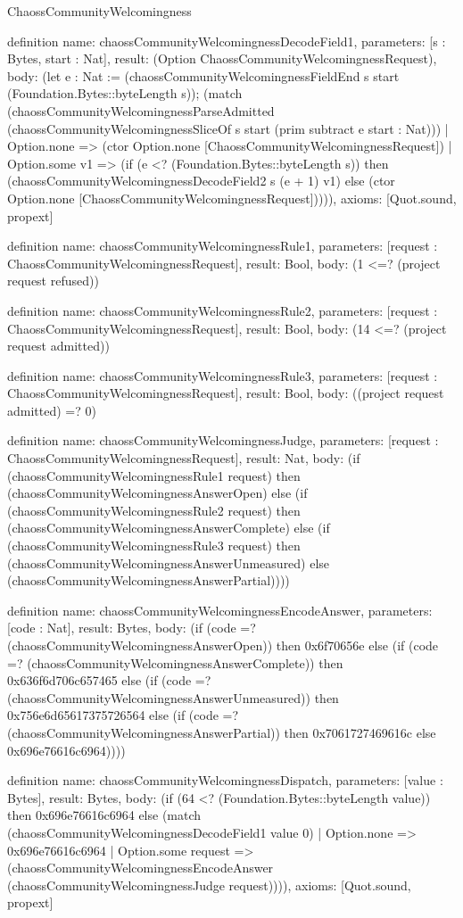 \begin{lexlean}{ChaossCommunityWelcomingness}
\begin{semanticmodule}
definition{
  name: chaossCommunityWelcomingnessDecodeField1,
  parameters: [s : Bytes, start : Nat],
  result: (Option ChaossCommunityWelcomingnessRequest),
  body: (let e : Nat := (chaossCommunityWelcomingnessFieldEnd s start (Foundation.Bytes::byteLength s)); (match (chaossCommunityWelcomingnessParseAdmitted (chaossCommunityWelcomingnessSliceOf s start (prim subtract e start : Nat)))
    | Option.none => (ctor Option.none [ChaossCommunityWelcomingnessRequest])
    | Option.some v1 => (if (e <? (Foundation.Bytes::byteLength s)) then (chaossCommunityWelcomingnessDecodeField2 s (e + 1) v1) else (ctor Option.none [ChaossCommunityWelcomingnessRequest])))),
  axioms: [Quot.sound, propext]
}

definition{
  name: chaossCommunityWelcomingnessRule1,
  parameters: [request : ChaossCommunityWelcomingnessRequest],
  result: Bool,
  body: (1 <=? (project request refused))
}

definition{
  name: chaossCommunityWelcomingnessRule2,
  parameters: [request : ChaossCommunityWelcomingnessRequest],
  result: Bool,
  body: (14 <=? (project request admitted))
}

definition{
  name: chaossCommunityWelcomingnessRule3,
  parameters: [request : ChaossCommunityWelcomingnessRequest],
  result: Bool,
  body: ((project request admitted) =? 0)
}

definition{
  name: chaossCommunityWelcomingnessJudge,
  parameters: [request : ChaossCommunityWelcomingnessRequest],
  result: Nat,
  body: (if (chaossCommunityWelcomingnessRule1 request) then (chaossCommunityWelcomingnessAnswerOpen) else (if (chaossCommunityWelcomingnessRule2 request) then (chaossCommunityWelcomingnessAnswerComplete) else (if (chaossCommunityWelcomingnessRule3 request) then (chaossCommunityWelcomingnessAnswerUnmeasured) else (chaossCommunityWelcomingnessAnswerPartial))))
}

definition{
  name: chaossCommunityWelcomingnessEncodeAnswer,
  parameters: [code : Nat],
  result: Bytes,
  body: (if (code =? (chaossCommunityWelcomingnessAnswerOpen)) then 0x6f70656e else (if (code =? (chaossCommunityWelcomingnessAnswerComplete)) then 0x636f6d706c657465 else (if (code =? (chaossCommunityWelcomingnessAnswerUnmeasured)) then 0x756e6d65617375726564 else (if (code =? (chaossCommunityWelcomingnessAnswerPartial)) then 0x7061727469616c else 0x696e76616c6964))))
}

definition{
  name: chaossCommunityWelcomingnessDispatch,
  parameters: [value : Bytes],
  result: Bytes,
  body: (if (64 <? (Foundation.Bytes::byteLength value)) then 0x696e76616c6964 else (match (chaossCommunityWelcomingnessDecodeField1 value 0)
    | Option.none => 0x696e76616c6964
    | Option.some request => (chaossCommunityWelcomingnessEncodeAnswer (chaossCommunityWelcomingnessJudge request)))),
  axioms: [Quot.sound, propext]
}
\end{semanticmodule}
\end{lexlean}
